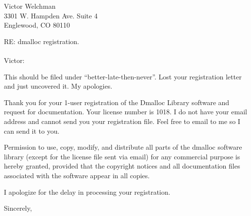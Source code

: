 

%
%

%
%
\address{Dmalloc Software \\
826 Savannah Ave. \\
Pittsburgh, PA  15221-3446 \\
1.412.244.8827}

\signature{Gray Watson \\
gray@letters.com}

\date{February 10, 1998}


\begin{letter}{Victor Welchman \\
3301 W. Hampden Ave.  Suite 4 \\
Englewood, CO  80110}

\opening{RE: dmalloc registration. \\
 \\
Victor:}

This should be filed under ``better-late-then-never''.  Lost your
registration letter and just uncovered it.  My apologies.

Thank you for your 
1-user registration of the Dmalloc Library software and request for
documentation.  Your license number is
1018.  I do not have your email address and cannot send you your
registration file.  Feel free to email to me so I can send it to you.

Permission to use, copy, modify, and distribute all parts of the
dmalloc software library (except for the license file sent via email)
for any commercial purpose is hereby granted, provided that the
copyright notices and all documentation files associated with the
software appear in all copies.

I apologize for the delay in processing your registration.

\closing{Sincerely,}

\end{letter}

